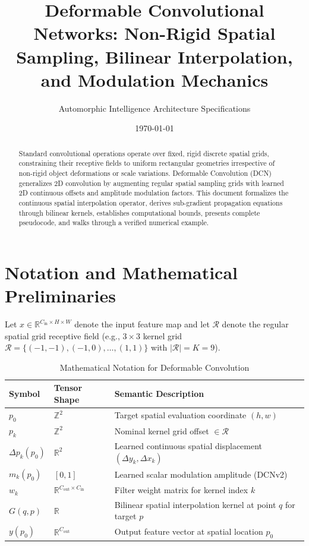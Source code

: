 \documentclass[11pt,a4paper]{article}
\title{Deformable Convolutional Networks: Non-Rigid Spatial Sampling, Bilinear Interpolation, and Modulation Mechanics}
\author{Automorphic Intelligence Architecture Specifications}
\date{\today}
\theoremstyle{definition}
\begin{document}
\maketitle

\begin{abstract}
Standard convolutional operations operate over fixed, rigid discrete spatial grids, constraining their receptive fields to uniform rectangular geometries irrespective of non-rigid object deformations or scale variations. Deformable Convolution (DCN) generalizes 2D convolution by augmenting regular spatial sampling grids with learned 2D continuous offsets and amplitude modulation factors. This document formalizes the continuous spatial interpolation operator, derives sub-gradient propagation equations through bilinear kernels, establishes computational bounds, presents complete pseudocode, and walks through a verified numerical example.
\end{abstract}

\section{Notation and Mathematical Preliminaries}

Let $x \in \mathbb{R}^{C_{\text{in}} \times H \times W}$ denote the input feature map and let $\mathcal{R}$ denote the regular spatial grid receptive field (e.g., $3 \times 3$ kernel grid $\mathcal{R} = \{(-1,-1), (-1,0), \dots, (1,1)\}$ with $|\mathcal{R}| = K = 9$).

\begin{table}[h]
\centering
\caption{Mathematical Notation for Deformable Convolution}
\begin{tabular}{lll}
\toprule
\textbf{Symbol} & \textbf{Tensor Shape} & \textbf{Semantic Description} \\
\midrule
$p_0$ & $\mathbb{Z}^2$ & Target spatial evaluation coordinate $(h, w)$ \\
$p_k$ & $\mathbb{Z}^2$ & Nominal kernel grid offset $\in \mathcal{R}$ \\
$\Delta p_k(p_0)$ & $\mathbb{R}^2$ & Learned continuous spatial displacement $(\Delta y_k, \Delta x_k)$ \\
$m_k(p_0)$ & $[0, 1]$ & Learned scalar modulation amplitude (DCNv2) \\
$w_k$ & $\mathbb{R}^{C_{\text{out}} \times C_{\text{in}}}$ & Filter weight matrix for kernel index $k$ \\
$G(q, p)$ & $\mathbb{R}$ & Bilinear spatial interpolation kernel at point $q$ for target $p$ \\
$y(p_0)$ & $\mathbb{R}^{C_{\text{out}}}$ & Output feature vector at spatial location $p_0$ \\
\bottomrule
\end{tabular}
\end{table}
\end{document}
